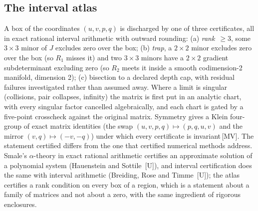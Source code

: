 \documentclass[11pt]{article}
\theoremstyle{definition}
\theoremstyle{remark}
\newcommand{\mk}[1]{\,{\scriptsize[#1]}}
\newcommand{\MV}{\mk{MV}}
\newcommand{\Um}{\mk{U}}
\begin{document}
\subsection{The interval atlas}

A box of the coordinates $(u,v,p,q)$ is discharged by one of three certificates, all in exact rational interval
arithmetic with outward rounding: (a) \emph{rank}~$\ge3$, some $3\times3$ minor of $J$ excludes zero over the box;
(b) \emph{trap}, a $2\times2$ minor excludes zero over the box (so $R_1$ misses it) and two $3\times3$ minors have a
$2\times2$ gradient subdeterminant excluding zero (so $R_2$ meets it inside a smooth codimension-2 manifold, dimension
2); (c) bisection to a declared depth cap, with residual failures investigated rather than assumed away. Where a limit
is singular (collisions, pair collapses, infinity) the matrix is first put in an analytic chart, with every
singular factor cancelled algebraically, and each chart is gated by a five-point crosscheck against the original matrix.
Symmetry gives a Klein four-group of exact matrix identities (the swap $(u,v,p,q)\mapsto(p,q,u,v)$ and the mirror
$(v,q)\mapsto(-v,-q)$) under which every certificate is invariant\MV.
The statement certified differs from the one that certified numerical methods address. Smale's $\alpha$-theory in exact
rational arithmetic certifies an approximate solution of a polynomial system (Hauenstein and Sottile
\cite{HS12}\Um), and interval certification does the same with interval arithmetic (Breiding, Rose and Timme
\cite{BRT23}\Um); the atlas certifies a rank condition on every box of a region, which is a statement about a
family of matrices and not about a zero, with the same ingredient of rigorous enclosures.
\end{document}
